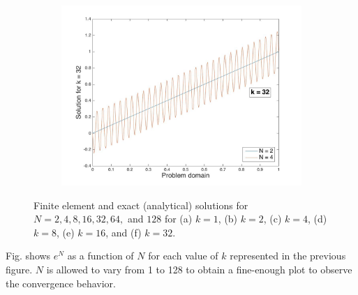\documentclass[10pt]{article}
\begin{document}
\begin{figure}[H]
\begin{subfigure}{.35\textwidth}
  \caption{}
\end{subfigure}
\begin{subfigure}{.35\textwidth}
  \centering
  \includegraphics[width=1.0\linewidth]{Nplot_for_k_32.jpg}
  \caption{}
\end{subfigure}
\caption{Finite element and exact (analytical) solutions for \(N=2, 4, 8, 16, 32, 64, \) and \(128\) for (a) \(k=1\), (b) \(k=2\), (c) \(k=4\), (d) \(k=8\), (e) \(k=16\), and (f) \(k=32\).}
\label{fig:Nplots}
\end{figure}

Fig. shows \(e^N\) as a function of \(N\) for each value of \(k\) represented in the previous figure. \(N\) is allowed to vary from 1 to 128 to obtain a fine-enough plot to observe the convergence behavior.
\end{document}

